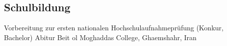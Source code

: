 \subsection{Schulbildung}
 {Vorbereitung zur ersten nationalen Hochschulaufnahmeprüfung (Konkur, Bachelor)}{}{}{}{}
 {Abitur}{
}{Beit ol Moghaddas College, Ghaemshahr, Iran}{}{}{}




